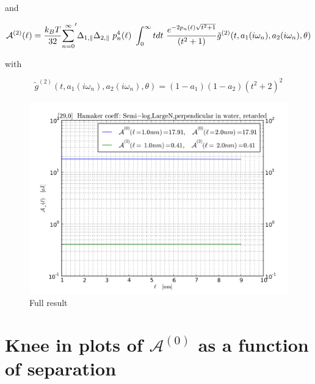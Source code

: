 \documentclass[a4paper]{article}
\begin{document}
\begin{center}

and

\begin{equation}
{\cal A}^{(2)}(\ell) = \frac{k_BT}{32}  {\sum_{n=0}^{\infty}}' \Delta_{1,\parallel} \Delta_{2,\parallel} ~p_n^{4}(\ell) ~\int_0^{\infty} t dt ~\frac{e^{- 2 p_n(\ell) \sqrt{t^{2} + 1}}}{(t^{2} + 1)} \tilde g^{(2)}(t, a_1(i \omega_n), a_2(i \omega_n), \theta)
\end{equation}

with

\begin{equation}
\tilde g^{(2)}(t, a_1(i \omega_n), a_2(i \omega_n), \theta) = (1-a_1)(1-a_2)(t^{2} + 2)^2
\label{befgqw}
\end{equation}

\begin{figure}[t!]
\begin{center}
\includegraphics[width=1.2\textwidth]{large_N/140322_290w290_HCs_semilog_perpendicular_ret_lrg_n.png}
\hskip 43pt
\caption{Full result}
\label{eiz65}
\end{center}
\end{figure} 

\chapter{Knee in plots of $\mathcal{A}^{(0)}$ as a function of separation}


\end{center}
\end{document}
